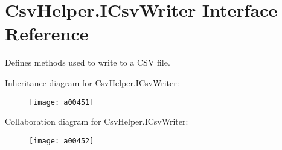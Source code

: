 \hypertarget{a00107}{\section{Csv\-Helper.\-I\-Csv\-Writer Interface Reference}
\label{a00107}
}


Defines methods used to write to a C\-S\-V file.  




Inheritance diagram for Csv\-Helper.\-I\-Csv\-Writer\-:
\nopagebreak
\begin{figure}[H]
\begin{center}
\leavevmode
\texttt{[image: a00451]}
\end{center}
\end{figure}


Collaboration diagram for Csv\-Helper.\-I\-Csv\-Writer\-:
\nopagebreak
\begin{figure}[H]
\begin{center}
\leavevmode
\texttt{[image: a00452]}
\end{center}
\end{figure}
